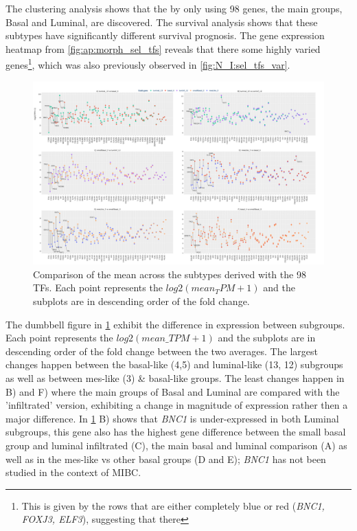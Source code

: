 The clustering analysis shows that the by only using 98 genes, the main groups, Basal and Luminal, are discovered. The survival analysis shows that these subtypes have significantly different survival prognosis. The gene expression heatmap from \cref{fig:ap:morph_sel_tfs} reveals that there some highly varied genes\footnote{This is given by the rows that are either completely blue or red (\textit{BNC1, FOXJ3, ELF3}), suggesting that there }, which was also previously observed in \cref{fig:N_I:sel_tfs_var}. 

\begin{figure}[!htb]   
\centering
\includegraphics[width=1.0\textwidth,height=1.0\textheight,keepaspectratio]{Sections/Network_I/Resources/selective_pruning/dumbell_sel_tfs.png}
  \caption{Comparison of the mean across the subtypes derived with the 98 TFs. Each point represents the $log2(mean_TPM+1)$ and the subplots are in descending order of the fold change.}
\label{fig:N_I:dumbell_sel_tfs}
\end{figure}


The dumbbell figure in \cref{fig:N_I:dumbell_sel_tfs} exhibit the difference in expression between subgroups. Each point represents the $log2(mean\_TPM+1)$ and the subplots are in descending order of the fold change between the two averages. The largest changes happen between the basal-like (4,5) and luminal-like (13, 12) subgroups as well as between mes-like (3) \& basal-like groups. The least changes happen in B) and F) where the main groups of Basal and Luminal are compared with the 'infiltrated' version, exhibiting a change in magnitude of expression rather then a major difference. In \cref{fig:N_I:dumbell_sel_tfs} B) shows that \textit{BNC1} is under-expressed in both Luminal subgroups, this gene also has the highest gene difference between the small basal group and luminal infiltrated (C), the main basal and luminal comparison (A) as well as in the mes-like vs other basal groups (D and E); \textit{BNC1} has not been studied in the context of MIBC. 

